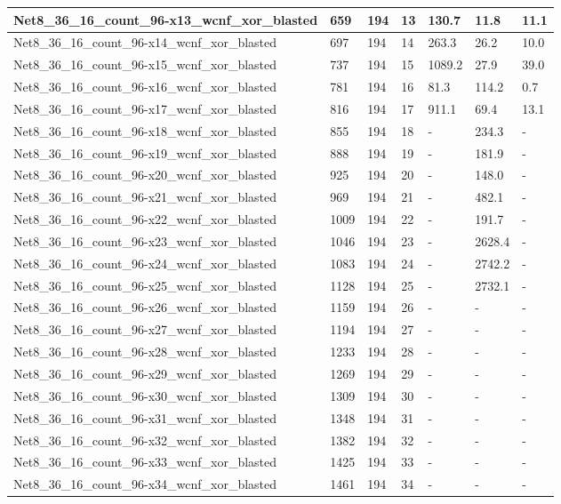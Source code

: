 \begin{scriptsize}
\begin{longtable}{|p{5cm}|l|l|l|l|l|l|}
Net8\_36\_16\_count\_96-x13\_wcnf\_xor\_blasted&659&194&13&130.7&11.8&11.1 \\ \hline 
Net8\_36\_16\_count\_96-x14\_wcnf\_xor\_blasted&697&194&14&263.3&26.2&10.0 \\ \hline 
Net8\_36\_16\_count\_96-x15\_wcnf\_xor\_blasted&737&194&15&1089.2&27.9&39.0 \\ \hline 
Net8\_36\_16\_count\_96-x16\_wcnf\_xor\_blasted&781&194&16&81.3&114.2&0.7 \\ \hline 
Net8\_36\_16\_count\_96-x17\_wcnf\_xor\_blasted&816&194&17&911.1&69.4&13.1 \\ \hline 
Net8\_36\_16\_count\_96-x18\_wcnf\_xor\_blasted&855&194&18&-&234.3&- \\ \hline 
Net8\_36\_16\_count\_96-x19\_wcnf\_xor\_blasted&888&194&19&-&181.9&- \\ \hline 
Net8\_36\_16\_count\_96-x20\_wcnf\_xor\_blasted&925&194&20&-&148.0&- \\ \hline 
Net8\_36\_16\_count\_96-x21\_wcnf\_xor\_blasted&969&194&21&-&482.1&- \\ \hline 
Net8\_36\_16\_count\_96-x22\_wcnf\_xor\_blasted&1009&194&22&-&191.7&- \\ \hline 
Net8\_36\_16\_count\_96-x23\_wcnf\_xor\_blasted&1046&194&23&-&2628.4&- \\ \hline 
Net8\_36\_16\_count\_96-x24\_wcnf\_xor\_blasted&1083&194&24&-&2742.2&- \\ \hline 
Net8\_36\_16\_count\_96-x25\_wcnf\_xor\_blasted&1128&194&25&-&2732.1&- \\ \hline 
Net8\_36\_16\_count\_96-x26\_wcnf\_xor\_blasted&1159&194&26&-&-&- \\ \hline 
Net8\_36\_16\_count\_96-x27\_wcnf\_xor\_blasted&1194&194&27&-&-&- \\ \hline 
Net8\_36\_16\_count\_96-x28\_wcnf\_xor\_blasted&1233&194&28&-&-&- \\ \hline 
Net8\_36\_16\_count\_96-x29\_wcnf\_xor\_blasted&1269&194&29&-&-&- \\ \hline 
Net8\_36\_16\_count\_96-x30\_wcnf\_xor\_blasted&1309&194&30&-&-&- \\ \hline 
Net8\_36\_16\_count\_96-x31\_wcnf\_xor\_blasted&1348&194&31&-&-&- \\ \hline 
Net8\_36\_16\_count\_96-x32\_wcnf\_xor\_blasted&1382&194&32&-&-&- \\ \hline 
Net8\_36\_16\_count\_96-x33\_wcnf\_xor\_blasted&1425&194&33&-&-&- \\ \hline 
Net8\_36\_16\_count\_96-x34\_wcnf\_xor\_blasted&1461&194&34&-&-&- \\ \hline 

\end{longtable}
\end{scriptsize}
